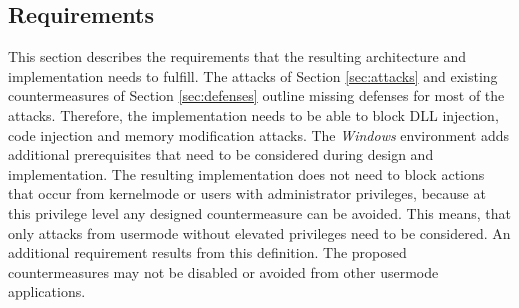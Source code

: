 \subsection{Requirements}
This section describes the requirements that the resulting architecture and implementation needs to fulfill. The attacks of Section \ref{sec:attacks} and existing countermeasures of Section \ref{sec:defenses} outline missing defenses for most of the attacks. Therefore, the implementation needs to be able to block DLL injection, code injection and memory modification attacks. The \emph{Windows} environment adds additional prerequisites that need to be considered during design and implementation. The resulting implementation does not need to block actions that occur from kernelmode or users with administrator privileges, because at this privilege level any designed countermeasure can be avoided. This means, that only attacks from usermode without elevated privileges need to be considered. An additional requirement results from this definition. The proposed countermeasures may not be disabled or avoided from other usermode applications.